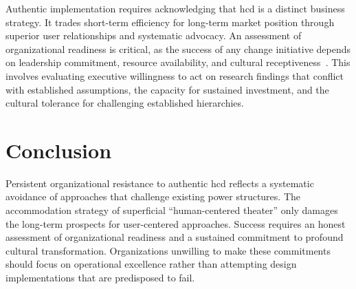 \documentclass[11pt,showkeys]{essay}
\begin{document}
Authentic implementation requires acknowledging that \gls{hcd} is a distinct business strategy. It trades short-term efficiency for long-term market position through superior user relationships and systematic advocacy. An assessment of organizational readiness is critical, as the success of any change initiative depends on leadership commitment, resource availability, and cultural receptiveness~\cite{errida_determinants_2021}. This involves evaluating executive willingness to act on research findings that conflict with established assumptions, the capacity for sustained investment, and the cultural tolerance for challenging established hierarchies.

\section{Conclusion}

Persistent organizational resistance to authentic \gls{hcd} reflects a systematic avoidance of approaches that challenge existing power structures. The accommodation strategy of superficial ``human-centered theater'' only damages the long-term prospects for user-centered approaches. Success requires an honest assessment of organizational readiness and a sustained commitment to profound cultural transformation. Organizations unwilling to make these commitments should focus on operational excellence rather than attempting design implementations that are predisposed to fail.


\end{document}
